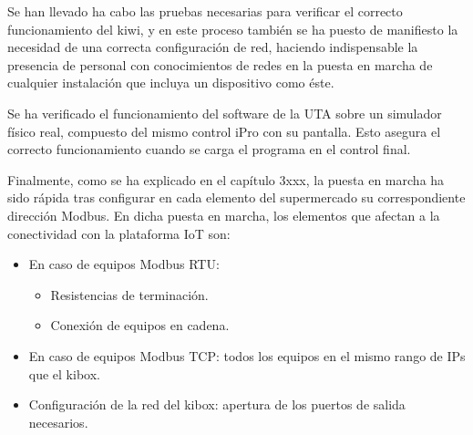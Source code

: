 
Se han llevado ha cabo las pruebas necesarias para verificar el correcto funcionamiento del kiwi, y en este proceso también se ha puesto de manifiesto la necesidad de una correcta configuración de red, haciendo indispensable la presencia de personal con conocimientos de redes en la puesta en marcha de cualquier instalación que incluya un dispositivo como éste.

Se ha verificado el funcionamiento del software de la UTA sobre un simulador físico real, compuesto del mismo control iPro con su pantalla. Esto asegura el correcto funcionamiento cuando se carga el programa en el control final.

Finalmente, como se ha explicado en el capítulo 3xxx, la puesta en marcha ha sido rápida tras configurar en cada elemento del supermercado su correspondiente dirección Modbus. En dicha puesta en marcha, los elementos que afectan a la conectividad con la plataforma IoT son:

\begin{itemize}
    \item En caso de equipos Modbus RTU: 
    \begin{itemize}
        \item Resistencias de terminación.
        \item Conexión de equipos en cadena.
    \end{itemize}
    \item En caso de equipos Modbus TCP: todos los equipos en el mismo rango de IPs que el kibox.
    \item Configuración de la red del kibox: apertura de los puertos de salida necesarios.
\end{itemize}





